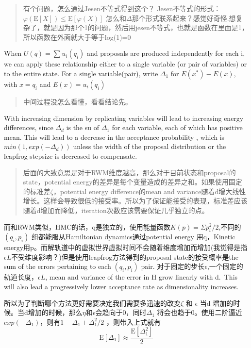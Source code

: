 \documentclass[
]{book}
\theoremstyle{definition}
\theoremstyle{definition}
\theoremstyle{definition}
\theoremstyle{remark}
\begin{document}
\begin{quote}
有个问题，怎么通过Jesen不等式得到这个？
Jesen不等式的形式：\(\varphi(\mathrm{E}[X]) \leq \mathrm{E}[\varphi(X)]\) 怎么和\(\Delta\)那个形式联系起来？感觉好奇怪.想复杂了，就是因为那个1的问题，然后用jesen不等式，也就是函数在里面是1，所以函数在外面就大于等于log(1)=0
\end{quote}

When \(U(q)=\sum u_i(q_i)\) and proposals are produced independently for each i, we can apply these relationship either to a single variable (or pair of variables) or to the entire state. For a single variable(pair), write \(\Delta_1\) for \(E(x^*)-E(x)\), with \(x=q_i\) and \(E(x)=u_i(q_i)\)

\begin{quote}
中间过程没怎么看懂，看看结论先。
\end{quote}

With increasing dimension by replicating variables will lead to increasing energy differences, since \(\Delta _d\) is the su of \(\Delta_1\) for each variable, each of which has positive mean. This will lead to a decrease in the acceptance probability , which is \(min(1,exp(-\Delta_d))\) unless the width of the proposal distribution or the leapfrog stepsize is decreased to compensate.

\begin{quote}
后面的大致意思是对于RWM维度越高，那么对于目前状态和proposal的state，potential energy的差异是每个变量造成的差异之和。如果使用固定的标准差\(\zeta\)，potential energy difference的mean and variance随着d增大线性增长。这样会导致很低的接受率。所以为了保证能接受的表现，标准差应该随着d增加而降低，iteration次数应该需要保证几乎独立的点。
\end{quote}

而和RWM类似，HMC的话，q是独立的，使用能量函数\(K(p)=\Sigma p_{i}^{2} / 2\),不同的\((q_i,p_i)\) 组都能服从Hamiltonian dynamics通过potential energy 用q，Kinetic energy用p。而解轨道中的虚拟世界虚拟时间不会随着维度增加而增加(我觉得是指\(\epsilon L\)不受维度影响？)但是使用leapfrog方法得到的proposal state的接受概率是the sum of the errors pertaining to each \((q_i,p_i)\) pair. 对于固定的步长\(\epsilon\),一个固定的轨道长度，\(\epsilon L\), mean and variance of the error in H grow linearly with d.~This will also lead a progressively lower acceptance rate as dimensionality increases.

所以为了判断哪个方法更好需要决定我们需要多迅速的改变\(\zeta\) 和 \(\epsilon\) 当d 增加的时候。当d增加的时候，那么\(\eta\)和\(\epsilon\)会趋向于0，同时\(\Delta_1\) 将会也趋于0。使用二阶逼近\(exp(-\Delta_1)\)，则有\(1-\Delta_{1}+\Delta_{1}^{2} / 2\) ，则带入上式就有
\[
\mathrm{E}\left[\Delta_{1}\right] \approx \frac{\mathrm{E}\left[\Delta_{1}^{2}\right]}{2}
\]
\end{document}
